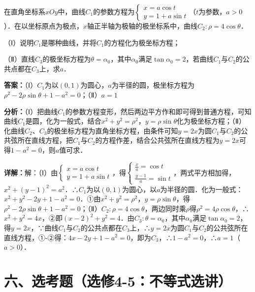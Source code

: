 \begin{question}[points=10]
在直角坐标系$xOy$中，曲线$C_1$的参数方程为$\begin{cases}x=a\cos t\\ y=1+a\sin t\end{cases}$（$t$为参数，$a>0$）．在以坐标原点为极点，$x$轴正半轴为极轴的极坐标系中，曲线$C_2:\rho=4\cos\theta$．

（Ⅰ）说明$C_1$是哪种曲线，并将$C_1$的方程化为极坐标方程；

（Ⅱ）直线$C_3$的极坐标方程为$\theta=\alpha_0$，其中$\alpha_0$满足$\tan\alpha_0=2$，若曲线$C_1$与$C_2$的公共点都在$C_3$上，求$a$．
\begin{solution}
\textbf{答案：}（Ⅰ）$C_1$为以$(0,1)$为圆心，$a$为半径的圆，极坐标方程为$\rho^2-2\rho\sin\theta+1-a^2=0$；（Ⅱ）$a=1$

\textbf{分析：}（Ⅰ）把曲线$C_1$的参数方程变形，然后两边平方作和即可得到普通方程，可知曲线$C_1$是圆，化为一般式，结合$x^2+y^2=\rho^2$，$y=\rho\sin\theta$化为极坐标方程；（Ⅱ）化曲线$C_2$、$C_3$的极坐标方程为直角坐标方程，由条件可知$y=2x$为圆$C_1$与$C_2$的公共弦所在直线方程，把$C_1$与$C_2$的方程作差，结合公共弦所在直线方程为$y=2x$可得$1-a^2=0$，则$a$值可求．

\textbf{详解：}解：（Ⅰ）由$\begin{cases}x=a\cos t\\ y=1+a\sin t\end{cases}$，得$\begin{cases}\frac{x}{a}=\cos t\\ \frac{y-1}{a}=\sin t\end{cases}$，两式平方相加得，$x^2+(y-1)^2=a^2$．∴$C_1$为以$(0,1)$为圆心，以$a$为半径的圆．化为一般式：$x^2+y^2-2y+1-a^2=0$．①由$x^2+y^2=\rho^2$，$y=\rho\sin\theta$，得$\rho^2-2\rho\sin\theta+1-a^2=0$；（Ⅱ）$C_2:\rho=4\cos\theta$，两边同时乘$\rho$得$\rho^2=4\rho\cos\theta$，∴$x^2+y^2=4x$，②即$(x-2)^2+y^2=4$．由$C_3:\theta=\alpha_0$，其中$\alpha_0$满足$\tan\alpha_0=2$，得$y=2x$，∵曲线$C_1$与$C_2$的公共点都在$C_3$上，∴$y=2x$为圆$C_1$与$C_2$的公共弦所在直线方程，①-②得：$4x-2y+1-a^2=0$，即为$C_3$，∴$1-a^2=0$，∴$a=1$（$a>0$）．
\end{solution}
\end{question}

\section*{六、选考题（选修4-5：不等式选讲）}

